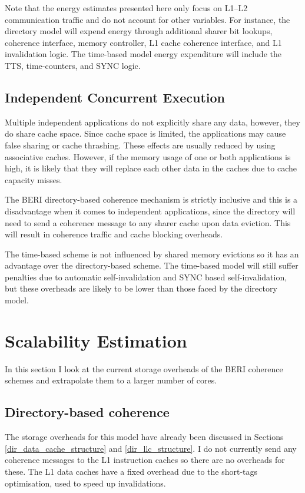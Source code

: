 			Note that the energy estimates presented here only focus on L1--L2 communication traffic and do not account for other variables. For instance, the directory model will expend energy through additional sharer bit lookups, coherence interface, memory controller, L1 cache coherence interface, and L1 invalidation logic. The time-based model energy expenditure will include the TTS, time-counters, and SYNC logic.
			
		\subsection{Independent Concurrent Execution}
			Multiple independent applications do not explicitly share any data, however, they do share cache space. Since cache space is limited, the applications may cause false sharing or cache thrashing. These effects are usually reduced by using associative caches. However, if the memory usage of one or both applications is high, it is likely that they will replace each other data in the caches due to cache capacity misses. 
			
			The BERI directory-based coherence mechanism is strictly inclusive and this is a disadvantage when it comes to independent applications, since the directory will need to send a coherence message to any sharer cache upon data eviction. This will result in coherence traffic and cache blocking overheads. 
			
			The time-based scheme is not influenced by shared memory evictions so it has an advantage over the directory-based scheme. The time-based model will still suffer penalties due to automatic self-invalidation and SYNC based self-invalidation, but these overheads are likely to be lower than those faced by the directory model.

		
	\section{Scalability Estimation}
		In this section I look at the current storage overheads of the BERI coherence schemes and extrapolate them to a larger number of cores.
		
		\subsection{Directory-based coherence}
			The storage overheads for this model have already been discussed in Sections \ref{dir_data_cache_structure} and \ref{dir_llc_structure}. I do not currently send any coherence messages to the L1 instruction caches so there are no overheads for these. The L1 data caches have a fixed overhead due to the short-tags optimisation, used to speed up invalidations. 
			
